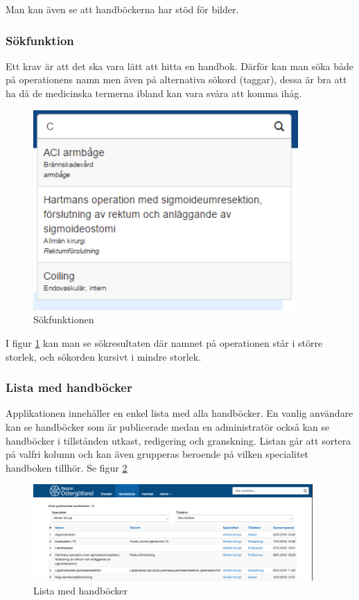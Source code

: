 Man kan även se att handböckerna har stöd för bilder.

\subsubsection{Sökfunktion}
Ett krav är att det ska vara lätt att hitta en handbok.
Därför kan man söka både på operationens namn men även på alternativa sökord (taggar), dessa är bra att ha då de medicinska termerna ibland kan vara svåra att komma ihåg.

\begin{figure}
  \centering
  \includegraphics[width=0.9\textwidth]{images/site/search}
  \caption{Sökfunktionen}
  \label{fig:search}
\end{figure}

I figur \ref{fig:search} kan man se sökresultaten där namnet på operationen står i större storlek, och sökorden kursivt i mindre storlek.

\subsubsection{Lista med handböcker}
Applikationen innehåller en enkel lista med alla handböcker. En vanlig användare kan se handböcker som är publicerade medan en administratör också kan se handböcker i tillstånden utkast, redigering och granskning. %
Listan går att sortera på valfri kolumn och kan även grupperas beroende på vilken specialitet handboken tillhör.
Se figur \ref{fig:list}

\begin{figure}
  \centering
  \includegraphics[width=0.95\textwidth]{images/site/list}
  \caption{Lista med handböcker}
  \label{fig:list}
\end{figure}

